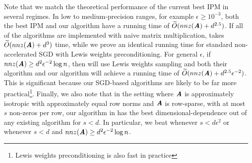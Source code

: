 Note that we match the theoretical performance of the current best IPM \citep{LeeS15} in several regimes. In low to medium-precision ranges, for example $\epsilon \ge 10^{-3}$, both the best IPM and our algorithm have a running time of $\Otil(nnz(\AA) + d^{2.5})$. If all of the algorithms are implemented with naive matrix multiplication, \cite{LeeS15} takes $\Otil(nnz(\AA) + d^3)$ time, while we prove an identical running time for standard non-accelerated SGD with Lewis weights preconditioning. For general $\epsilon$, if $nnz(\AA) \ge d^2 \epsilon^{-2} \log n$, then \cite{LeeS15} will use Lewis weights sampling and both their algorithm and our algorithm will achieve a running time of $\Otil(nnz(\AA) + d^{2.5}\epsilon^{-2})$. This is significant because our SGD-based algorithms are likely to be far more practical\footnote{Lewis weights preconditioning is also fast in practice}. Finally, we also note that in the setting where $\AA$ is approximately isotropic with approximately equal row norms and $\AA$ is row-sparse, with at most $s$ non-zeros per row, our algorithm in  has the best dimensional-dependence out of any existing algorithm for $s < d$. In particular, we beat \cite{LeeS15} whenever $s < d\epsilon^{2}$ or whenever $s<d$ and $nnz(\AA) \ge d^2 \epsilon^{-2} \log n$.

\renewcommand{\arraystretch}{1.3} %


